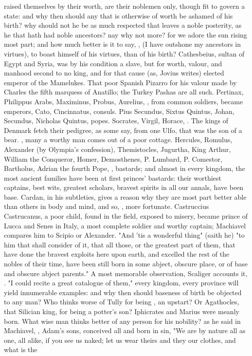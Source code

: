 {raised themselves by their worth, are their noblemen only, though fit to govern a state: and why then should any that is otherwise of worth be ashamed of his birth? why should not he be as much respected that leaves a noble posterity, as he that hath had noble ancestors? nay why not more? for  we adore the sun rising most part; and how much better is it to say, , (I have outshone my ancestors in virtues), to boast himself of his virtues, than of his birth? Cathesbeius, sultan of Egypt and Syria, was by his condition a slave, but for worth, valour, and manhood second to no king, and for that cause (as, Jovius writes) elected emperor of the Mamelukes. That poor Spanish Pizarro for his valour made by Charles the fifth marquess of Anatillo; the Turkey Pashas are all such. Pertinax, Philippus Arabs, Maximinus, Probus, Aurelius, \etc{}, from common soldiers, became emperors, Cato, Cincinnatus, \etc{} consuls. Pius Secundus, Sixtus Quintus, Johan, Secundus, Nicholas Quintus, \etc{} popes. Socrates, Virgil, Horace, . The kings of Denmark fetch their pedigree, as some say, from one Ulfo, that was the son of a bear. , many a worthy man comes out of a poor cottage. Hercules, Romulus, Alexander (by Olympia's confession), Themistocles, Jugurtha, King Arthur, William the Conqueror, Homer, Demosthenes, P. Lumbard, P. Comestor, Bartholus, Adrian the fourth Pope, \etc{}, bastards; and almost in every kingdom, the most ancient families have been at first princes' bastards: their worthiest captains, best wits, greatest scholars, bravest spirits in all our annals, have been base. Cardan, in his subtleties, gives a reason why they are most part better able than others in body and mind, and so, , more fortunate. Castruccius Castrucanus, a poor child, found in the field, exposed to misery, became prince of Lucca and Senes in Italy, a most complete soldier and worthy captain; Machiavel compares him to Scipio or Alexander. "And 'tis a wonderful thing" (saith he) "to him that shall consider of it, that all those, or the greatest part of them, that have done the bravest exploits here upon earth, and excelled the rest of the nobles of their time, have been still born in some abject, obscure place, or of base and obscure abject parents." A most memorable observation, Scaliger accounts it, . "I could recite a great catalogue of them," every kingdom, every province will yield innumerable examples: and why then should baseness of birth be objected to any man? Who thinks worse of Tully for being , an upstart? Or Agathocles, that Silician king, for being a potter's son? Iphicrates and Marius were meanly born. What wise man thinks better of any person for his nobility? as he said in Machiavel, , Adam's sons, conceived all and born in sin, \etc{} "We are by nature all as one, all alike, if you see us naked; let us wear theirs and they our clothes, and what is the }
